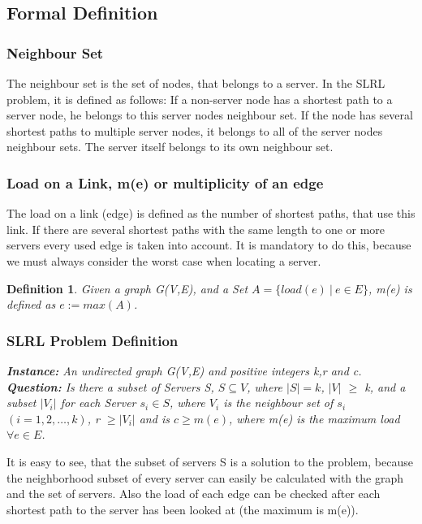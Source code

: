 \documentclass [12pt]{article}
\newtheorem{mydef}{Definition}
\begin{document}
\subsection{Formal Definition}
\subsubsection{Neighbour Set}
The neighbour set is the set of nodes, that belongs to a server. In the SLRL problem, it is
defined as follows: If a non-server node has a shortest path to a server node, he 
belongs to this server nodes neighbour set. If the node has several shortest
paths to multiple server nodes, it belongs to all of the server nodes neighbour
sets. The server itself belongs to its own neighbour set.
\subsubsection{Load on a Link, m(e) or multiplicity of an edge}
The load on a link (edge) is defined as the number of shortest paths, that use this link. If there
are several shortest paths with the same length to one or more servers every
used edge is taken into account. It is mandatory to do this, because we must always consider
the worst case when locating a server. 
\begin{mydef}
  Given a graph G(V,E), and a Set $A= \{ load(e) \ | \ e \in E \}$, m(e) is defined as $e:= max(A)$.
\end{mydef}
\subsubsection{SLRL Problem Definition}

{\itshape \textbf{Instance:} An undirected graph G(V,E) and  positive integers k,r and c.\\
  \textbf{Question:} 
  Is there a subset of Servers S, $S \subseteq V$, where $|S| = k$, $|V|$ $\geq$ k,
  and a subset $|V_i|$ for each Server $s_i \in S$, where $V_i$ is the neighbour set of $s_i$ $(i=1,2,\dots,k)$, r $\geq  |V_i|$ 
and is $c \geq m(e)$, where m(e) is the maximum load $\forall e \in E$.} 


It is easy to see, that the subset of servers S is a solution to the problem, because the neighborhood subset
of every server can easily be calculated with the graph and the set of servers. Also the load of each edge
can be checked after each shortest path to the server has been looked at (the maximum is m(e)).
\end{document}
